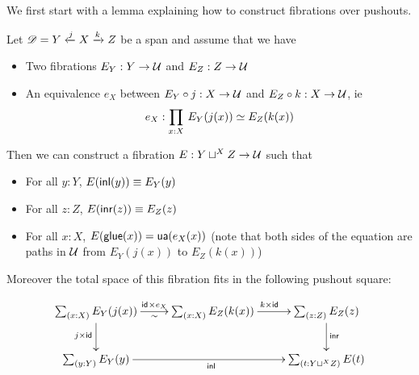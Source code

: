 We first start with a lemma explaining how to construct fibrations over
pushouts.
%

\begin{lem}\label{lem:fibration-over-pushout}
  Let $\mathscr{D}=Y\xleftarrow{j}X\xrightarrow{k}Z$ be a span and assume
  that we have
  \begin{itemize}
  \item Two fibrations $E_Y:Y\to\mathcal{U}$ and $E_Z:Z\to\mathcal{U}$
  \item An equivalence $e_X$ between $E_Y\circ j:X\to\mathcal{U}$ and $E_Z\circ
    k:X\to\mathcal{U}$, ie
    \[e_X:\prd{x:X}\eqv{E_Y(j(x))}{E_Z(k(x))}\]
  \end{itemize}

  Then we can construct a fibration $E:Y\sqcup^XZ\to\mathcal{U}$ such that
  \begin{itemize}
  \item For all $y:Y$, $E({\mathsf{inl}}(y))\equiv E_Y(y)$
  \item For all $z:Z$, $E({\mathsf{inr}}(z))\equiv E_Z(z)$
  \item For all $x:X$, ${E}\mathopen{}\left({\mathsf{glue}(x)}\right)\mathclose{}=\mathsf{ua}(e_X(x))$ (note that both sides of
    the equation are paths in $\mathcal{U}$ from $E_Y(j(x))$ to $E_Z(k(x))$)
  \end{itemize}

  Moreover the total space of this fibration fits in the following pushout
  square:

  \[\xymatrix{ \sm{x:X}E_Y(j(x)) \ar[r]_\sim^{\idfunc\times e_X}
    \ar[d]_{j\times\idfunc} &
    \sm{x:X}E_Z(k(x)) \ar[r]^{k\times\idfunc}
    & \sm{z:Z}E_Z(z) \ar[d]^\inr \\
    \sm{y:Y}E_Y(y) \ar[rr]_\inl & & \sm{t:Y\sqcup^XZ}E(t) }\]
\end{lem}

